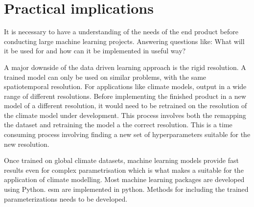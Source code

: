 \section{Practical implications} \label{sec:practical_implications}
It is necessary to have a understanding of the needs of the end product before conducting large machine learning projects. Answering questions like: What will it be used for and how can it be implemented in useful way?

A major downside of the data driven learning approach is the rigid resolution. A trained model can only be used on similar problems, with the same spatiotemporal resolution. For applications like climate models, output in a wide range of different resolutions. Before implementing the finished product in a new model of a different resolution, it would need to be retrained on the resolution of the climate model under development. This process involves both the remapping the dataset and retraining the model a the correct resolution. This is a time consuming process involving finding a new set of hyperparameters suitable for the new resolution. %

Once trained on global climate datasets, machine learning models provide fast results even for complex parametrisation which is what makes a suitable for the application of climate modelling. Most machine learning packages are developed using Python. \acrfull{esm} are implemented in python. Methods for including the trained parameterizations needs to be developed.
 